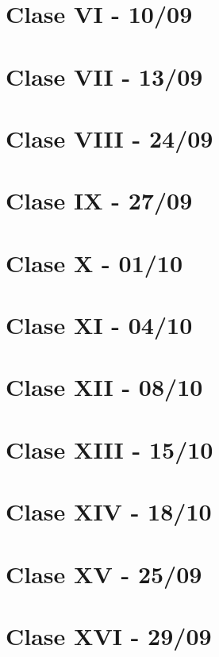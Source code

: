 \documentclass[12pt,a4paper]{book}
\begin{document}
\chapter{Clase VI - 10/09}


\chapter{Clase VII - 13/09}


\chapter{Clase VIII - 24/09}


\chapter{Clase IX - 27/09}


\chapter{Clase X - 01/10}


\chapter{Clase XI - 04/10}


\chapter{Clase XII - 08/10}


\chapter{Clase XIII - 15/10}


\chapter{Clase XIV - 18/10}


\chapter{Clase XV - 25/09}


\chapter{Clase XVI - 29/09}

\end{document}
